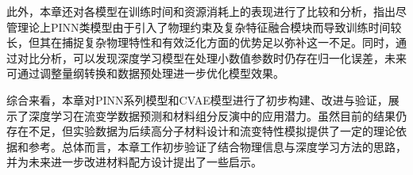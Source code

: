 此外，本章还对各模型在训练时间和资源消耗上的表现进行了比较和分析，指出尽管理论上PINN类模型由于引入了物理约束及复杂特征融合模块而导致训练时间较长，但其在捕捉复杂物理特性和有效泛化方面的优势足以弥补这一不足。同时，通过对比分析，可以发现深度学习模型在处理小数值参数时仍存在归一化误差，未来可通过调整量纲转换和数据预处理进一步优化模型效果。

综合来看，本章对PINN系列模型和CVAE模型进行了初步构建、改进与验证，展示了深度学习在流变学数据预测和材料组分反演中的应用潜力。虽然目前的结果仍存在不足，但实验数据为后续高分子材料设计和流变特性模拟提供了一定的理论依据和参考。总体而言，本章工作初步验证了结合物理信息与深度学习方法的思路，并为未来进一步改进材料配方设计提出了一些启示。
